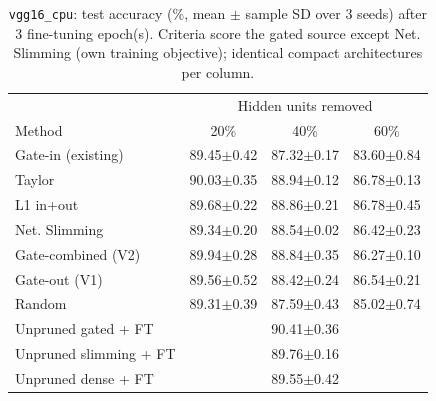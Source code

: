 \begin{table}[t]
\centering
\caption{\texttt{vgg16\_cpu}: test accuracy (\%, mean $\pm$ sample SD over 3 seeds) after 3 fine-tuning epoch(s). Criteria score the gated source except Net. Slimming (own training objective); identical compact architectures per column.}
\label{tab:vgg16_cpu_main}
\footnotesize
\setlength{\tabcolsep}{2.5pt}
\begin{tabular}{lccc}
\toprule
 & \multicolumn{3}{c}{Hidden units removed} \\
Method & 20\% & 40\% & 60\% \\
\midrule
Gate-in (existing) & 89.45$\pm$0.42 & 87.32$\pm$0.17 & 83.60$\pm$0.84 \\
Taylor & 90.03$\pm$0.35 & 88.94$\pm$0.12 & 86.78$\pm$0.13 \\
L1 in+out & 89.68$\pm$0.22 & 88.86$\pm$0.21 & 86.78$\pm$0.45 \\
Net. Slimming & 89.34$\pm$0.20 & 88.54$\pm$0.02 & 86.42$\pm$0.23 \\
Gate-combined (V2) & 89.94$\pm$0.28 & 88.84$\pm$0.35 & 86.27$\pm$0.10 \\
Gate-out (V1) & 89.56$\pm$0.52 & 88.42$\pm$0.24 & 86.54$\pm$0.21 \\
Random & 89.31$\pm$0.39 & 87.59$\pm$0.43 & 85.02$\pm$0.74 \\
\midrule
Unpruned gated + FT & \multicolumn{3}{c}{90.41$\pm$0.36} \\
Unpruned slimming + FT & \multicolumn{3}{c}{89.76$\pm$0.16} \\
Unpruned dense + FT & \multicolumn{3}{c}{89.55$\pm$0.42} \\
\bottomrule
\end{tabular}
\end{table}